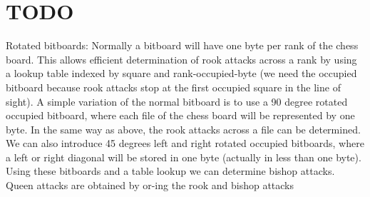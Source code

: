 \chapter{TODO}
\hypertarget{md_TODO}{}\label{md_TODO}

\begin{DoxyItemize}
\item[\DoxyUnchecked] Rotated bitboards\+: Normally a bitboard will have one byte per rank of the chess board. This allows efficient determination of rook attacks across a rank by using a lookup table indexed by square and rank-\/occupied-\/byte (we need the occupied bitboard because rook attacks stop at the first occupied square in the line of sight). A simple variation of the normal bitboard is to use a 90 degree rotated occupied bitboard, where each file of the chess board will be represented by one byte. In the same way as above, the rook attacks across a file can be determined. We can also introduce 45 degrees left and right rotated occupied bitboards, where a left or right diagonal will be stored in one byte (actually in less than one byte). Using these bitboards and a table lookup we can determine bishop attacks. Queen attacks are obtained by or-\/ing the rook and bishop attacks 
\end{DoxyItemize}